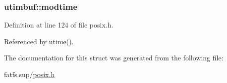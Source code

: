 \subsubsection[{\texorpdfstring{modtime}{modtime}}]{ utimbuf\+::modtime}\hypertarget{structutimbuf_a7588ffe699a9eda52e94aa593bf7d6d8}{}\label{structutimbuf_a7588ffe699a9eda52e94aa593bf7d6d8}


Definition at line 124 of file posix.\+h.



Referenced by utime().



The documentation for this struct was generated from the following file\+:\begin{DoxyCompactItemize}
\item 
fatfs.\+sup/\hyperlink{posix_8h}{posix.\+h}\end{DoxyCompactItemize}
